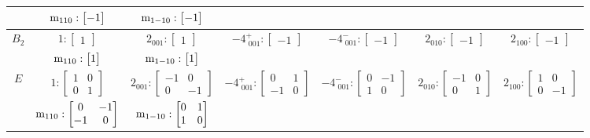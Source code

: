 \documentclass[fleqn,8pt,landscape]{jsarticle}
\begin{document}
\begin{longtable}{ccccccc}
& $ {\rm m}_{110}:\begin{bmatrix} -1 \end{bmatrix} $ & $ {\rm m}_{1-10}:\begin{bmatrix} -1 \end{bmatrix} $ & $  $ & $  $ & $  $ & $  $ \\ \hline
$ B_{2} $ & $ 1:\begin{bmatrix} 1 \end{bmatrix} $ & $ 2{}_{001}:\begin{bmatrix} 1 \end{bmatrix} $ & $ -4^{+}_{\,\,001}:\begin{bmatrix} -1 \end{bmatrix} $ & $ -4^{-}_{\,\,001}:\begin{bmatrix} -1 \end{bmatrix} $ & $ 2{}_{010}:\begin{bmatrix} -1 \end{bmatrix} $ & $ 2{}_{100}:\begin{bmatrix} -1 \end{bmatrix} $ \\
& $ {\rm m}_{110}:\begin{bmatrix} 1 \end{bmatrix} $ & $ {\rm m}_{1-10}:\begin{bmatrix} 1 \end{bmatrix} $ & $  $ & $  $ & $  $ & $  $ \\ \hline
$ E $ & $ 1:\begin{bmatrix} 1 & 0 \\ 0 & 1 \end{bmatrix} $ & $ 2{}_{001}:\begin{bmatrix} -1 & 0 \\ 0 & -1 \end{bmatrix} $ & $ -4^{+}_{\,\,001}:\begin{bmatrix} 0 & 1 \\ -1 & 0 \end{bmatrix} $ & $ -4^{-}_{\,\,001}:\begin{bmatrix} 0 & -1 \\ 1 & 0 \end{bmatrix} $ & $ 2{}_{010}:\begin{bmatrix} -1 & 0 \\ 0 & 1 \end{bmatrix} $ & $ 2{}_{100}:\begin{bmatrix} 1 & 0 \\ 0 & -1 \end{bmatrix} $ \\
& $ {\rm m}_{110}:\begin{bmatrix} 0 & -1 \\ -1 & 0 \end{bmatrix} $ & $ {\rm m}_{1-10}:\begin{bmatrix} 0 & 1 \\ 1 & 0 \end{bmatrix} $ & $  $ & $  $ & $  $ & $  $ \\
\end{longtable}
\end{document}
